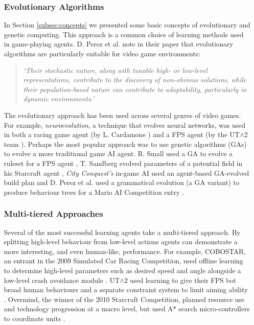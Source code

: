 \subsubsection{Evolutionary Algorithms}

In Section \ref{subsec:concepts} we presented some basic concepts of evolutionary and genetic computing. This approach is a common choice of learning methods used in game-playing agents. D. Perez et al. note in their paper \cite[p.~1]{gramev} that evolutionary algorithms are particularly suitable for video game environments: 
\begin{quote}\itshape
`Their stochastic nature, along with tunable high- or low-level representations, contribute to the discovery of non-obvious solutions, while their population-based nature can contribute to adaptability, particularly in dynamic environments.'
\end{quote}
The evolutionary approach has been used across several genres of video games. For example, \emph{neuroevolution}, a technique that evolves neural networks, was used in both a racing game agent (by L. Cardamone \cite[p.~137]{scrc}) and a FPS agent (by the UT$\wedge$2 team \cite{2kbot}). Perhaps the most popular approach was to use genetic algorithms (GAs) to evolve a more traditional game AI agent. R. Small used a GA to evolve a ruleset for a FPS agent \cite{agentsmith}, T. Sandberg evolved parameters of a potential field in his Starcraft agent \cite{emapf} , \emph{City Conquest's} in-game AI used an agent-based GA-evolved build plan \cite{evolutioningamedesign} and D. Perez et al. used a grammatical evolution (a GA variant) to produce behaviour trees for a Mario AI Competition entry \cite{gramev}.

\subsubsection{Multi-tiered Approaches}

Several of the most successful learning agents take a multi-tiered approach. By splitting high-level behaviour from low-level actions agents can demonstrate a more interesting, and even human-like, performance. For example, COBOSTAR, an entrant in the 2009 Simulated Car Racing Competition, used offline learning to determine high-level parameters such as desired speed and angle alongside a low-level crash avoidance module \cite[p.~136]{scrc}. UT$\wedge$2 used learning to give their FPS bot broad human behaviours and a separate constraint system to limit aiming ability \cite{2kbot}.  Overmind, the winner of the 2010 Starcraft Competition, planned resource use and technology progression at a macro level, but used A* search micro-controllers to coordinate units \cite{overmind}. 

